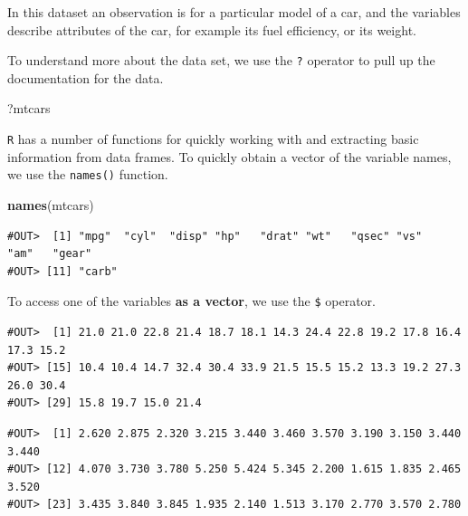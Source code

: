 \documentclass[]{book}
\newenvironment{Shaded}{\begin{snugshade}}{\end{snugshade}}
\newcommand{\KeywordTok}[1]{\textcolor[rgb]{0.13,0.29,0.53}{\textbf{#1}}}
\newcommand{\OperatorTok}[1]{\textcolor[rgb]{0.81,0.36,0.00}{\textbf{#1}}}
\newcommand{\NormalTok}[1]{#1}
\theoremstyle{definition}
\theoremstyle{definition}
\theoremstyle{definition}
\theoremstyle{remark}
\begin{document}
In this dataset an observation is for a particular model of a car, and
the variables describe attributes of the car, for example its fuel
efficiency, or its weight.

To understand more about the data set, we use the \texttt{?} operator to
pull up the documentation for the data.

\begin{Shaded}
\begin{Highlighting}[]
\NormalTok{?mtcars}
\end{Highlighting}
\end{Shaded}

\texttt{R} has a number of functions for quickly working with and
extracting basic information from data frames. To quickly obtain a
vector of the variable names, we use the \texttt{names()} function.

\begin{Shaded}
\begin{Highlighting}[]
\KeywordTok{names}\NormalTok{(mtcars)}
\end{Highlighting}
\end{Shaded}

\begin{verbatim}
#OUT>  [1] "mpg"  "cyl"  "disp" "hp"   "drat" "wt"   "qsec" "vs"   "am"   "gear"
#OUT> [11] "carb"
\end{verbatim}

To access one of the variables \textbf{as a vector}, we use the
\texttt{\$} operator.

\begin{Shaded}
\end{Shaded}

\begin{verbatim}
#OUT>  [1] 21.0 21.0 22.8 21.4 18.7 18.1 14.3 24.4 22.8 19.2 17.8 16.4 17.3 15.2
#OUT> [15] 10.4 10.4 14.7 32.4 30.4 33.9 21.5 15.5 15.2 13.3 19.2 27.3 26.0 30.4
#OUT> [29] 15.8 19.7 15.0 21.4
\end{verbatim}

\begin{Shaded}
\end{Shaded}

\begin{verbatim}
#OUT>  [1] 2.620 2.875 2.320 3.215 3.440 3.460 3.570 3.190 3.150 3.440 3.440
#OUT> [12] 4.070 3.730 3.780 5.250 5.424 5.345 2.200 1.615 1.835 2.465 3.520
#OUT> [23] 3.435 3.840 3.845 1.935 2.140 1.513 3.170 2.770 3.570 2.780
\end{verbatim}
\end{document}
